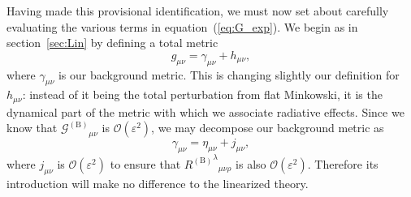 \documentclass[a4paper, 11pt, titlepage, twoside]{report}
\newcommand{\eqnref}[1]{equation~(\ref{eq:#1})}
\newcommand{\secref}[1]{section~\ref{sec:#1}}
\newcommand{\order}[1]{\ensuremath{\mathcal{O}({#1})}}
\begin{document}
Having made this provisional identification, we must now set about carefully evaluating the various terms in \eqnref{G_exp}. We begin as in \secref{Lin} by defining a total metric
\begin{equation}
g_{\mu\nu} = \gamma_{\mu\nu} + h_{\mu\nu},
\end{equation}
where $\gamma_{\mu\nu}$ is our background metric. This is changing slightly our definition for $h_{\mu\nu}$: instead of it being the total perturbation from flat Minkowski, it is the dynamical part of the metric with which we associate radiative effects. Since we know that ${\mathcal{G}^{(\mathrm{B})}}_{\mu\nu}$ is $\order{\varepsilon^2}$, we may decompose our background metric as
\begin{equation}
\gamma_{\mu\nu} = \eta_{\mu\nu} + j_{\mu\nu},
\end{equation}
where $j_{\mu\nu}$ is $\order{\varepsilon^2}$ to ensure that ${{R^{(\mathrm{B})}}^\lambda}_{\mu\nu\rho}$ is also $\order{\varepsilon^2}$. Therefore its introduction will make no difference to the linearized theory.
\end{document}
